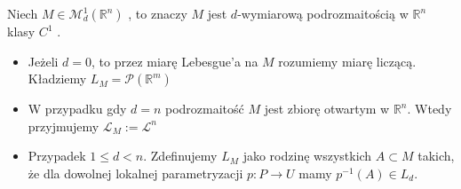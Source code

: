 \begin{defi}
    Niech $M \in \mathcal{M}_d^1(\mathbb{R}^n)$ , to znaczy $M$ jest $d$-wymiarową podrozmaitością w $\mathbb{R}^n$ klasy $C^1$ .
    \begin{itemize}
        \item Jeżeli $d=0$, to przez miarę Lebesgue'a na $M$ rozumiemy miarę liczącą. Kładziemy $L_M = \mathcal{P}(\mathbb{R}^m)$
        \item W przypadku gdy $d=n$ podrozmaitość $M$ jest zbiorę otwartym w $\mathbb{R}^n$. Wtedy przyjmujemy $\mathcal{L}_M := \mathcal{L}^n$
        \item Przypadek $1 \leq d < n$. Zdefinujemy $L_M$ jako rodzinę wszystkich $A \subset M$ takich, że dla dowolnej lokalnej parametryzacji $p : P \rightarrow U$ mamy $p^{-1}(A) \in L_d$. 
    \end{itemize}
\end{defi}